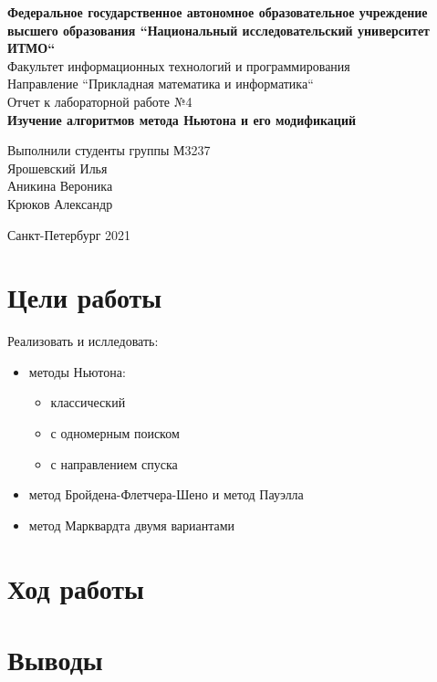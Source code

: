 \documentclass[english]{article}
\date{}
\title{}
\begin{document}
\begin{titlepage}
  \begin{center}
    \large\textbf{Федеральное государственное автономное образовательное учреждение высшего образования ``Национальный исследовательский университет ИТМО``} \\
    \vspace{0.5cm}
    Факультет информационных технологий и программирования \\
    \vspace{0.5cm}
    Направление ``Прикладная математика и информатика`` \\
    \vspace{3cm}
    Отчет к лабораторной работе №4 \\
    \vspace{0.5cm}
    \textbf{Изучение алгоритмов метода Ньютона и его модификаций}
  \end{center}
  \vfill
  \begin{flushright}
    \large
    Выполнили студенты группы М3237 \\
    \vspace{0.5cm}
    Ярошевский Илья \\
    Аникина Вероника \\
    Крюков Александр
  \end{flushright}
  \vspace{3cm}
  \begin{center}
    Санкт-Петербург 2021
  \end{center}
\end{titlepage}
\section{Цели работы}
Реализовать и ислледовать:
\begin{itemize}
\item методы Ньютона:
  \begin{itemize}
  \item классический
  \item с одномерным поиском
  \item с направлением спуска
  \end{itemize}
\item метод Бройдена-Флетчера-Шено и метод Пауэлла
\item метод Марквардта двумя вариантами
\end{itemize}
\section{Ход работы}
\section{Выводы}
\end{document}
